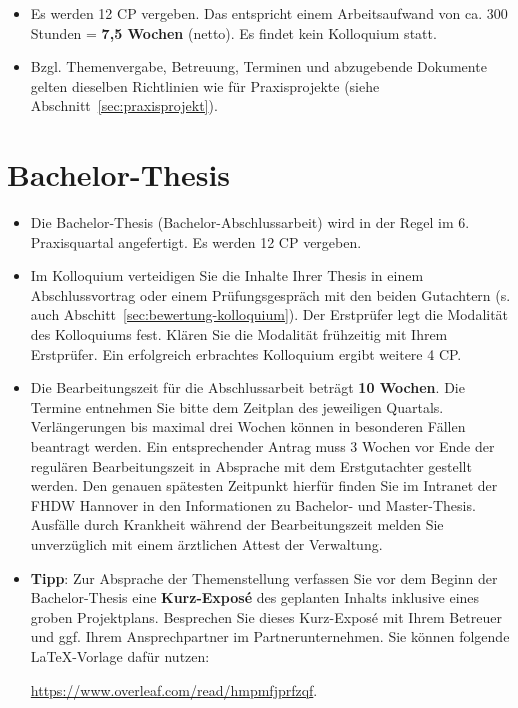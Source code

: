 \begin{itemize}
    \item Es werden 12 CP vergeben. Das entspricht einem Arbeitsaufwand von ca. 300 Stunden = \textbf{7,5 Wochen} (netto).
    Es findet kein Kolloquium statt.
    \item Bzgl. Themenvergabe, Betreuung, Terminen und abzugebende Dokumente gelten dieselben Richtlinien wie für Praxisprojekte (siehe Abschnitt~\ref{sec:praxisprojekt}).
\end{itemize}


\section{Bachelor-Thesis}

\begin{itemize}
    \item Die Bachelor-Thesis (Bachelor-Abschlussarbeit) wird in der Regel im 6. Praxisquartal angefertigt. Es werden 12 CP vergeben.
    
    \item Im Kolloquium verteidigen Sie die Inhalte Ihrer Thesis in einem Abschlussvortrag oder einem Prüfungsgespräch mit den beiden Gutachtern (s. auch Abschitt~\ref{sec:bewertung-kolloquium}).
    Der Erstprüfer legt die Modalität des Kolloquiums fest. Klären Sie die Modalität frühzeitig mit Ihrem Erstprüfer. Ein erfolgreich erbrachtes Kolloquium ergibt weitere 4 CP.
    
    \item Die Bearbeitungszeit für die Abschlussarbeit beträgt \textbf{10 Wochen}. Die Termine entnehmen Sie bitte dem Zeitplan des jeweiligen Quartals. Verlängerungen bis maximal drei Wochen können in besonderen Fällen beantragt werden. Ein entsprechender Antrag muss 3 Wochen vor Ende der regulären Bearbeitungszeit in Absprache mit dem Erstgutachter gestellt werden. Den genauen spätesten Zeitpunkt hierfür finden Sie im Intranet der FHDW Hannover in den Informationen zu Bachelor- und Master-Thesis.
    Ausfälle durch Krankheit während der Bearbeitungszeit melden Sie unverzüglich mit einem ärztlichen Attest der Verwaltung.
    
    \item \textbf{Tipp}: Zur Absprache der Themenstellung verfassen Sie vor dem Beginn der Bachelor-Thesis eine \textbf{Kurz-Exposé} des geplanten Inhalts inklusive eines groben Projektplans. Besprechen Sie dieses Kurz-Exposé mit Ihrem Betreuer und ggf. Ihrem Ansprechpartner im Partnerunternehmen. Sie können folgende \LaTeX{}-Vorlage dafür nutzen:
    
    \begin{center}
    \url{https://www.overleaf.com/read/hmpmfjprfzqf}.
    \end{center}

\end{itemize}


